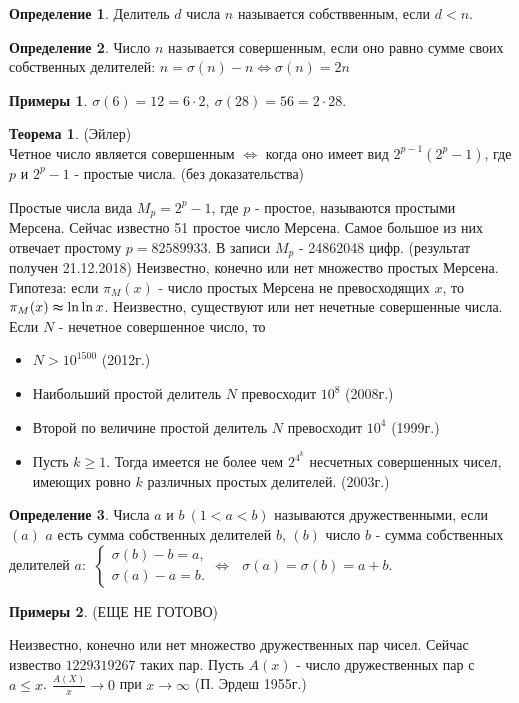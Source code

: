 \documentclass[a4paper, 12pt]{article}
\newcommand{\lra}{\Leftrightarrow}
\theoremstyle{definition}
\newtheorem{definition}{Определение}[section]
\newtheorem{theorem}{Теорема}[section]
\newtheorem*{examples}{Примеры}
\begin{document}
    \begin{definition}
        Делитель $d$ числа $n$ называется собстввенным, если $d<n$.
    \end{definition} 
    \begin{definition}
        Число $n$ называется совершенным, если оно равно сумме своих собственных делителей: $n=\sigma(n)-n\lra \sigma(n)=2n$
    \end{definition}
    \begin{examples}
        $\sigma(6)=12=6\cdot 2,\ \sigma(28)=56=2\cdot 28$.
    \end{examples}
    \begin{theorem} (Эйлер)\\
        Четное число является совершенным $\lra$ когда оно имеет вид $2^{p-1}(2^p-1)$, где $p$ и $2^p-1$ - простые числа. (без доказательства)
    \end{theorem} 
    Простые числа вида $M_p=2^p-1$, где $p$ - простое, называются простыми Мерсена. Сейчас известно 51 простое число Мерсена. Самое большое из них отвечает простому $p=82589933$. В записи $M_p$ - 24862048 цифр. (результат получен 21.12.2018) Неизвестно, конечно или нет множество простых Мерсена. Гипотеза: если $\pi_M(x)$ - число простых Мерсена не превосходящих $x$, то\\
    $\pi_M(x)\thickapprox \ln\ln x$. Неизвестно, существуют или нет нечетные совершенные числа. Если $N$ - нечетное совершенное число, то
    \begin{itemize}
        \item[(1)] $N>10^{1500}$ (2012г.)
        \item[(2)] Наибольший простой делитель $N$ превосходит $10^8$ (2008г.)
        \item[(3)] Второй по величине простой делитель $N$ превосходит $10^4$ (1999г.)
        \item[(4)] Пусть $k\geq 1$. Тогда имеется не более чем $2^{4^k}$ несчетных совершенных чисел, имеющих ровно $k$ различных простых делителей. (2003г.)  
    \end{itemize}
    \begin{definition}
        Числа $a$ и $b\ (1<a<b)$ называются дружественными, если $(a)$ $a$ есть сумма собственных делителей $b$, $(b)$ число $b$ - сумма собственных делителей $a$:
         $\ \begin{cases}
            \sigma(b)-b=a,\\
            \sigma(a)-a=b.
         \end{cases} \lra\ \ \ \sigma(a)=\sigma(b)=a+b$.   
    \end{definition}
    \begin{examples}
        (ЕЩЕ НЕ ГОТОВО)
    \end{examples}
    Неизвестно, конечно или нет множество дружественных пар чисел. Сейчас извество $1229319267$ таких пар.
    Пусть $A(x)$ - число дружественных пар с $a\leq x$. $\frac{A(X)}{x}\to 0$ при $x\to \infty$ (П. Эрдеш 1955г.)
    \newpage
\end{document}
